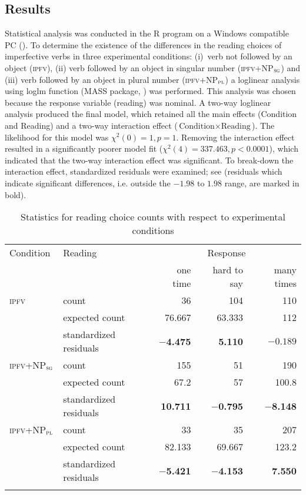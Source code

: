 \documentclass[output=paper]{langscibook}
\begin{document}
\subsection{Results}\label{jan-bla:fansb:kb:sec3.2}

Statistical analysis was conducted in the R program on a Windows compatible PC (\citealt{RDevelopmentCoreTeam2019}). To determine the existence of the differences in the reading choices of imperfective verbs in three experimental conditions: (i)~verb not followed by an object (\textsc{ipfv}), (ii) verb followed by an object in singular number (\textsc{ipfv}+NP$_\textsc{sg}$) and (iii) verb followed by an object in plural number (\textsc{ipfv}+NP$_\textsc{pl}$) a loglinear analysis using loglm function (MASS package, \citealt{VenablesRipley2002}) was performed. This analysis was chosen because the response variable (reading) was nominal. A two-way loglinear analysis produced the final model, which retained all the main effects (Condition and Reading) and a two-way interaction effect ($\text{Condition}\times\text{Reading}$). The likelihood for this model was $\chi^2(0) = 1, p =1$. Removing the interaction effect resulted in a significantly poorer model fit ($\chi^2(4) = 337.463, p < 0.0001$), which indicated that the two-way interaction effect was significant. To break-down the interaction effect, standardized residuals were examined; see  (residuals which indicate significant differences, i.e. outside the $-1.98$ to $1.98$ range, are marked in bold). 

\begin{table}[p]
\caption{Statistics for reading choice counts with respect to experimental conditions}
\label{jan-bla:fansb:kb:tab3}
 \begin{tabular}{llrrr}
  \lsptoprule
  Condition & Reading& \multicolumn{3}{c}{Response}\\\cmidrule(lr){3-5}
     & & one time & hard to say & many times\\\midrule
    \textsc{ipfv} & count & 36 & 104 & 110\\
    & expected count &	76.667 & 63.333	& 112\\
    & standardized residuals & $-$\textbf{4.475} & \textbf{5.110} & $-0.189$\\\tablevspace
    \textsc{ipfv}+NP$_\textsc{sg}$ & count & 155	& 51 & 190\\
    & expected count &	67.2 &	57 & 100.8\\
    & standardized residuals & \textbf{10.711} & $-$\textbf{0.795} & $-$\textbf{8.148}\\\tablevspace
    \textsc{ipfv}+NP$_\textsc{pl}$ & count & 33 & 35 & 207\\
    & expected count &	82.133 & 69.667 & 123.2\\
    & standardized residuals & $-$\textbf{5.421} & $-$\textbf{4.153} & \textbf{7.550}\\
  \lspbottomrule
 \end{tabular}
\end{table}
\end{document}
